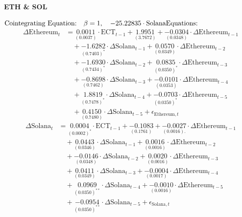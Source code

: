 %
\begin{center}
   \textbf{ETH \& SOL}
\end{center}
$\text{Cointegrating Equation:} \quad  \beta = 1, \quad -25.22835 \cdot \text{Solana} \\
\text{Equations:} $
\begin{align*}
 \quad
\Delta \text{Ethereum}_t &= 
\underset{(0.0037)}{0.0011} \cdot \text{ECT}_{t-1} + 
\underset{(3.7672)}{1.9951} + 
\underset{(0.0348)}{-0.0304} \cdot \Delta \text{Ethereum}_{t-1} \\
&\quad + \underset{(0.7403)^*}{-1.6282} \cdot \Delta \text{Solana}_{t-1} + 
\underset{(0.0349)}{0.0570} \cdot \Delta \text{Ethereum}_{t-2} \\
&\quad + \underset{(0.7434)^*}{-1.6930} \cdot \Delta \text{Solana}_{t-2} + 
\underset{(0.0350)^*}{0.0835} \cdot \Delta \text{Ethereum}_{t-3} \\
&\quad + \underset{(0.7462)}{-0.8698} \cdot \Delta \text{Solana}_{t-3} + 
\underset{(0.0353)}{-0.0101} \cdot \Delta \text{Ethereum}_{t-4} \\
&\quad + \underset{(0.7478)^*}{1.8819} \cdot \Delta \text{Solana}_{t-4} + 
\underset{(0.0350)^*}{-0.0703} \cdot \Delta \text{Ethereum}_{t-5} \\
&\quad + \underset{(0.7480)}{0.4150} \cdot \Delta \text{Solana}_{t-5} + \epsilon_{\text{Ethereum},t}
\end{align*}
\begin{align*}
 \quad
\Delta \text{Solana}_t &= 
\underset{(0.0002)^*}{0.0004} \cdot \text{ECT}_{t-1} + 
\underset{(0.1761)}{-0.1083} + 
\underset{(0.0016).}{-0.0027} \cdot \Delta \text{Ethereum}_{t-1} \\
&\quad + \underset{(0.0346)}{0.0443} \cdot \Delta \text{Solana}_{t-1} + 
\underset{(0.0016)}{0.0016} \cdot \Delta \text{Ethereum}_{t-2} \\
&\quad + \underset{(0.0348)}{-0.0146} \cdot \Delta \text{Solana}_{t-2} + 
\underset{(0.0016)}{0.0020} \cdot \Delta \text{Ethereum}_{t-3} \\
&\quad + \underset{(0.0349)}{0.0411} \cdot \Delta \text{Solana}_{t-3} + 
\underset{(0.0017)}{-0.0004} \cdot \Delta \text{Ethereum}_{t-4} \\
&\quad + \underset{(0.0350)^{**}}{0.0969} \cdot \Delta \text{Solana}_{t-4} + 
\underset{(0.0016)}{-0.0010} \cdot \Delta \text{Ethereum}_{t-5} \\
&\quad + \underset{(0.0350)^{**}}{-0.0954} \cdot \Delta \text{Solana}_{t-5} + \epsilon_{\text{Solana},t}
\end{align*}


